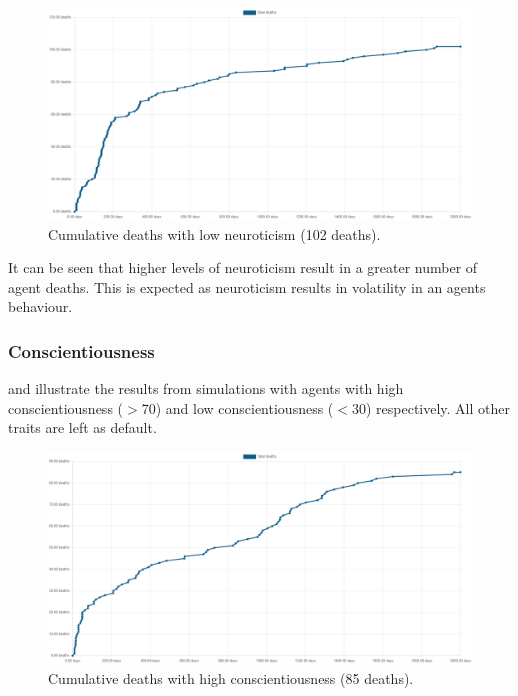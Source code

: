 \begin{figure}[H]
    \begin{center}
        \includegraphics[scale=0.25]{009_team_7_agent_design/Images/Cumulative Deaths, With Treaties, T7Only, 2000days, 20food, Low Neur, 102deaths.png}
    \end{center}
    \caption{Cumulative deaths with low neuroticism (102 deaths).}
    \label{fig: Low Neuroticism}
\end{figure}

It can be seen that higher levels of neuroticism result in a greater number of agent deaths. This is expected as neuroticism results in volatility in an agents behaviour. 

\newpage
\subsubsection{Conscientiousness}
\label{subsubsec: Conscientiousness}

 and  illustrate the results from simulations with agents with high conscientiousness ($>$70) and low conscientiousness ($<$30) respectively. All other traits are left as default.

\begin{figure}[H]
    \begin{center}
        \includegraphics[scale=0.25]{009_team_7_agent_design/Images/Cumulative Deaths, With Treaties, T7Only, 2000days, 20food, High Conscient, 85deaths.png}
    \end{center}
    \caption{Cumulative deaths with high conscientiousness (85 deaths).}
    \label{fig: High Conscientiousness}
\end{figure}

